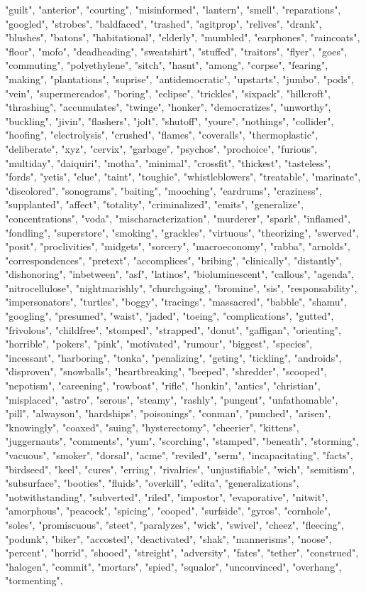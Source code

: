 "guilt", "anterior", "courting", "misinformed", "lantern", "smell", "reparations", "googled", "strobes", "baldfaced", "trashed", "agitprop", "relives", "drank", "blushes", "batons", "habitational", "elderly", "mumbled", "earphones", "raincoats", "floor", "mofo", "deadheading", "sweatshirt", "stuffed", "traitors", "flyer", "goes", "commuting", "polyethylene", "sitch", "hasnt", "among", "corpse", "fearing", "making", "plantations", "suprise", "antidemocratic", "upstarts", "jumbo", "pods", "vein", "supermercados", "boring", "eclipse", "trickles", "sixpack", "hillcroft", "thrashing", "accumulates", "twinge", "honker", "democratizes", "unworthy", "buckling", "jivin", "flashers", "jolt", "shutoff", "youre", "nothings", "collider", "hoofing", "electrolysis", "crushed", "flames", "coveralls", "thermoplastic", "deliberate", "xyz", "cervix", "garbage", "psychos", "prochoice", "furious", "multiday", "daiquiri", "motha", "minimal", "crossfit", "thickest", "tasteless", "fords", "yetis", "clue", "taint", "toughie", "whistleblowers", "treatable", "marinate", "discolored", "sonograms", "baiting", "mooching", "eardrums", "craziness", "supplanted", "affect", "totality", "criminalized", "emits", "generalize", "concentrations", "voda", "mischaracterization", "murderer", "spark", "inflamed", "fondling", "superstore", "smoking", "grackles", "virtuous", "theorizing", "swerved", "posit", "proclivities", "midgets", "sorcery", "macroeconomy", "rabba", "arnolds", "correspondences", "pretext", "accomplices", "bribing", "clinically", "distantly", "dishonoring", "inbetween", "asf", "latinos", "bioluminescent", "callous", "agenda", "nitrocellulose", "nightmarishly", "churchgoing", "bromine", "sis", "responsability", "impersonators", "turtles", "boggy", "tracings", "massacred", "babble", "shamu", "googling", "presumed", "waist", "jaded", "toeing", "complications", "gutted", "frivolous", "childfree", "stomped", "strapped", "donut", "gaffigan", "orienting", "horrible", "pokers", "pink", "motivated", "rumour", "biggest", "species", "incessant", "harboring", "tonka", "penalizing", "geting", "tickling", "androids", "disproven", "snowballs", "heartbreaking", "beeped", "shredder", "scooped", "nepotism", "careening", "rowboat", "rifle", "honkin", "antics", "christian", "misplaced", "astro", "serous", "steamy", "rashly", "pungent", "unfathomable", "pill", "alwayson", "hardships", "poisonings", "conman", "punched", "arisen", "knowingly", "coaxed", "suing", "hysterectomy", "cheerier", "kittens", "juggernauts", "comments", "yum", "scorching", "stamped", "beneath", "storming", "vacuous", "smoker", "dorsal", "acme", "reviled", "serm", "incapacitating", "facts", "birdseed", "keel", "cures", "erring", "rivalries", "unjustifiable", "wich", "semitism", "subsurface", "booties", "fluids", "overkill", "edita", "generalizations", "notwithstanding", "subverted", "riled", "impostor", "evaporative", "nitwit", "amorphous", "peacock", "spicing", "cooped", "surfside", "gyros", "cornhole", "soles", "promiscuous", "steet", "paralyzes", "wick", "swivel", "cheez", "fleecing", "podunk", "biker", "accosted", "deactivated", "shak", "mannerisms", "noose", "percent", "horrid", "shooed", "streight", "adversity", "fates", "tether", "construed", "halogen", "commit", "mortars", "spied", "squalor", "unconvinced", "overhang", "tormenting", 